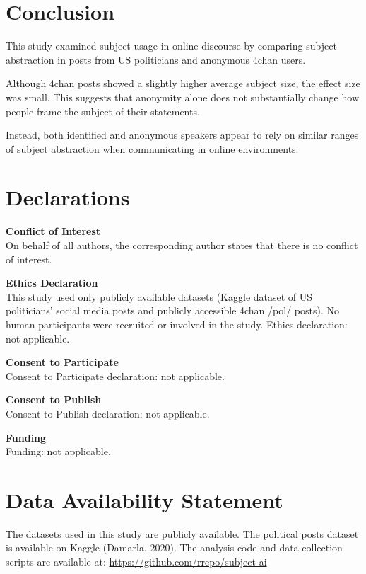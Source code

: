 \documentclass{article}
\begin{document}
\section{Conclusion}

This study examined subject usage in online discourse by comparing subject 
abstraction in posts from US politicians and anonymous 4chan users.

Although 4chan posts showed a slightly higher average subject size, the 
effect size was small. This suggests that anonymity alone does not 
substantially change how people frame the subject of their statements.

Instead, both identified and anonymous speakers appear to rely on similar 
ranges of subject abstraction when communicating in online environments.

\section*{Declarations}

\textbf{Conflict of Interest}\\
On behalf of all authors, the corresponding author states that there is no conflict of interest.

\textbf{Ethics Declaration}\\
This study used only publicly available datasets (Kaggle dataset of US politicians' social media posts and publicly accessible 4chan /pol/ posts). No human participants were recruited or involved in the study. Ethics declaration: not applicable.

\textbf{Consent to Participate}\\
Consent to Participate declaration: not applicable.

\textbf{Consent to Publish}\\
Consent to Publish declaration: not applicable.

\textbf{Funding}\\
Funding: not applicable.

\section*{Data Availability Statement}
The datasets used in this study are publicly available. 
The political posts dataset is available on Kaggle (Damarla, 2020). 
The analysis code and data collection scripts are available at: 
\url{https://github.com/rrepo/subject-ai}
\end{document}
